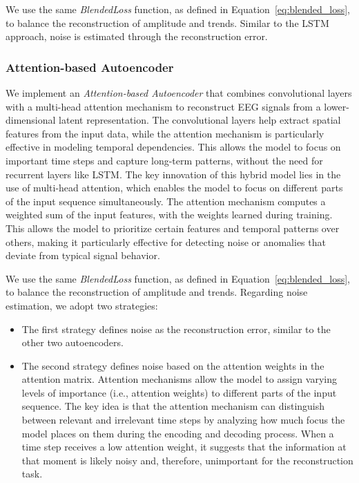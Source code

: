 We use the same \emph{BlendedLoss} function, as defined in Equation~\ref{eq:blended_loss}, to balance the reconstruction of amplitude and trends. Similar to the LSTM approach, noise is estimated through the reconstruction error.

\subsubsection{Attention-based Autoencoder}

We implement an \emph{Attention-based Autoencoder} that combines convolutional layers with a multi-head attention mechanism to reconstruct EEG signals from a lower-dimensional latent representation. The convolutional layers help extract spatial features from the input data, while the attention mechanism is particularly effective in modeling temporal dependencies. This allows the model to focus on important time steps and capture long-term patterns, without the need for recurrent layers like LSTM. The key innovation of this hybrid model lies in the use of multi-head attention, which enables the model to focus on different parts of the input sequence simultaneously. The attention mechanism computes a weighted sum of the input features, with the weights learned during training. This allows the model to prioritize certain features and temporal patterns over others, making it particularly effective for detecting noise or anomalies that deviate from typical signal behavior.

We use the same \emph{BlendedLoss} function, as defined in Equation~\ref{eq:blended_loss}, to balance the reconstruction of amplitude and trends. Regarding noise estimation, we adopt two strategies:

\begin{itemize}
    \item The first strategy defines noise as the reconstruction error, similar to the other two autoencoders.
    \vspace{-0.5cm}
    \item The second strategy defines noise based on the attention weights in the attention matrix. Attention mechanisms allow the model to assign varying levels of importance (i.e., attention weights) to different parts of the input sequence. The key idea is that the attention mechanism can distinguish between relevant and irrelevant time steps by analyzing how much focus the model places on them during the encoding and decoding process. When a time step receives a low attention weight, it suggests that the information at that moment is likely noisy and, therefore, unimportant for the reconstruction task.
\end{itemize}

